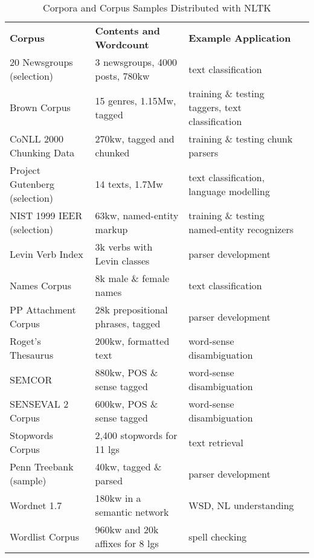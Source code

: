 \documentclass[11pt]{article}
\begin{document}
\begin{table*}
\small\noindent
\begin{boxedminipage}{\linewidth}
\begin{tabular}{llll}
\setlength{\tabcolsep}{0.5\tabcolsep}
\textbf{Corpus} &
\textbf{Contents and Wordcount} &
\textbf{Example Application} \\

20 Newsgroups (selection) &
3 newsgroups, 4000 posts, 780kw &
text classification \\

Brown Corpus &
15 genres, 1.15Mw, tagged &
training \& testing taggers, text classification \\

CoNLL 2000 Chunking Data &
270kw, tagged and chunked &
training \& testing chunk parsers \\

Project Gutenberg (selection) &
14 texts, 1.7Mw &
text classification, language modelling \\

NIST 1999 IEER (selection) &
63kw, named-entity markup &
training \& testing named-entity recognizers \\

Levin Verb Index &
3k verbs with Levin classes &
parser development \\

Names Corpus &
8k male \& female names &
text classification \\

PP Attachment Corpus &
28k prepositional phrases, tagged &
parser development \\

Roget's Thesaurus &
200kw, formatted text &
word-sense disambiguation \\

SEMCOR &
880kw, POS \& sense tagged &
word-sense disambiguation \\

SENSEVAL 2 Corpus &
600kw, POS \& sense tagged &
word-sense disambiguation \\

Stopwords Corpus &
2,400 stopwords for 11 lgs &
text retrieval \\

Penn Treebank (sample) &
40kw, tagged \& parsed &
parser development \\

Wordnet 1.7 &
180kw in a semantic network &
WSD, NL understanding \\

Wordlist Corpus &
960kw and 20k affixes for 8 lgs &
spell checking
 \\
\end{tabular}
\caption{Corpora and Corpus Samples Distributed with NLTK}\label{tab:data}
\end{boxedminipage}
\end{table*}
\end{document}
